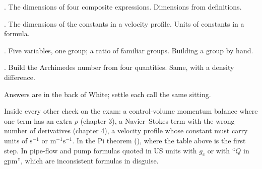 \begin{ladder}
\item {}. The dimensions of four composite expressions. Dimensions from definitions.
\item {}. The dimensions of the constants in a velocity profile. Units of constants in a formula.
\item {}. Five variables, one group; a ratio of familiar groups. Building a group by hand.
\item {}. Build the Archimedes number from four quantities. Same, with a density difference.
\end{ladder}
Answers are in the back of White; settle each call the same sitting.


\begin{hides}
Inside every other check on the exam: a control-volume momentum balance where one term has an extra $\rho$ (chapter 3), a Navier--Stokes term with the wrong number of derivatives (chapter 4), a velocity profile whose constant must carry units of $\mathrm{s^{-1}}$ or $\mathrm{m^{-1}s^{-1}}$. In the Pi theorem (), where the table above is the first step. In pipe-flow and pump formulas quoted in US units with $g_c$ or with ``$Q$ in gpm'', which are inconsistent formulas in disguise.
\end{hides}
